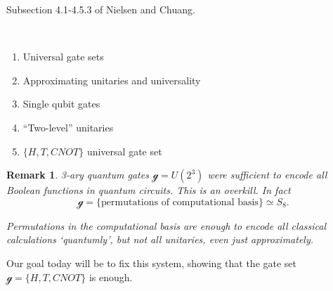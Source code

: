 \documentclass{article}
\newtheorem*{remark}{Remark}
\begin{document}
    \noindent

    \vspace{.3cm}
     Subsection 4.1-4.5.3 of Nielsen and Chuang. 

\

    \begin{enumerate}
         \item Universal gate sets
         \item Approximating unitaries and universality
         \item Single qubit gates
         \item ``Two-level'' unitaries 
         \item $\{ H, T, CNOT \}$ universal gate set
    \end{enumerate}

\begin{remark}
    3-ary quantum gates $\mathcal{g} = U \left( 2^3 \right)$ were sufficient to encode all Boolean functions in quantum circuits. This is an overkill. In fact
    \begin{equation*}
        \mathcal{g} = \{ \text{permutations of computational basis} \} \simeq S_8.
    \end{equation*}

    Permutations in the computational basis are enough to encode all classical calculations `quantumly', but not all unitaries, even just approximately.
\end{remark}

Our goal today will be to fix this system, showing that the gate set $\mathcal{g} = \{ H, T, CNOT \}$ is enough.
\end{document}
